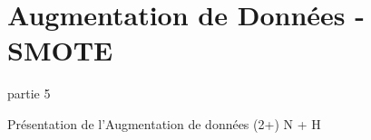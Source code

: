 \section{Augmentation de Données - SMOTE}

\begin{frame}{partie 5}
  \vspace{0.45cm}
  \begin{pointcle}
    \centering\large
    Présentation de l'Augmentation de données (2+) N + H
  \end{pointcle}
\end{frame}

